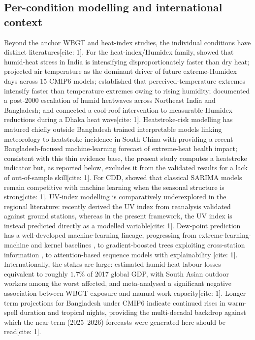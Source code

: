 \documentclass[pdflatex,sn-mathphys-ay]{sn-jnl}
\begin{document}
\subsection{Per-condition modelling and international context}
Beyond the anchor WBGT and heat-index studies, the individual conditions have distinct literatures[cite: 1]. For the heat-index/Humidex family, \citet{sojan2024humidheat} showed that humid-heat stress in India is intensifying disproportionately faster than dry heat; \citet{kushwaha2026humidex} projected air temperature as the dominant driver of future extreme-Humidex days across 15 CMIP6 models; \citet{scoccimarro2017humidity} established that perceived-temperature extremes intensify faster than temperature extremes owing to rising humidity; \citet{saha2025postescalation} documented a post-2000 escalation of humid heatwaves across Northeast India and Bangladesh; and \citet{tabassum2025coolroofs} connected a cool-roof intervention to measurable Humidex reductions during a Dhaka heat wave[cite: 1]. Heatstroke-risk modelling has matured chiefly outside Bangladesh \citet{xuh2024heatstroke} trained interpretable models linking meteorology to heatstroke incidence in South China with \citet{ehsan2026extremeheat} providing a recent Bangladesh-focused machine-learning forecast of extreme-heat health impact; consistent with this thin evidence base, the present study computes a heatstroke indicator but, as reported below, excludes it from the validated results for a lack of out-of-sample skill[cite: 1]. For CDD, \citet{bilgili2023cdd} showed that classical SARIMA models remain competitive with machine learning when the seasonal structure is strong[cite: 1]. UV-index modelling is comparatively underexplored in the regional literature: \citet{teggi2026uvindex} recently derived the UV index from reanalysis validated against ground stations, whereas in the present framework, the UV index is instead predicted directly as a modelled variable[cite: 1]. Dew-point prediction has a well-developed machine-learning lineage, progressing from extreme-learning-machine and kernel baselines \citep{mohammadi2015elm,qasem2019dewpoint}, to gradient-boosted trees exploiting cross-station information \citep{yao2022catboost}, to attention-based sequence models with explainability \citep{abdullah2025xai}[cite: 1]. Internationally, the stakes are large: \citet{parsons2021labor} estimated humid-heat labour losses equivalent to roughly $1.7\%$ of 2017 global GDP, with South Asian outdoor workers among the worst affected, and \citet{flouris2022} meta-analysed a significant negative association between WBGT exposure and manual work capacity[cite: 1]. Longer-term projections for Bangladesh under CMIP6 \citep{khatun2024} indicate continued rises in warm-spell duration and tropical nights, providing the multi-decadal backdrop against which the near-term (2025--2026) forecasts were generated here should be read[cite: 1].
\end{document}

